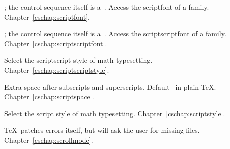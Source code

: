 \begin{glossinventory}
\item [\cs{scriptfont\gr{4-bit number}}]
      ; the control sequence itself
      is a~.
      Access the scriptfont of a family.
Chapter~\ref{cschap:scriptfont}.

\item [\cs{scriptscriptfont\gr{4-bit number}}]
      ; the control sequence itself
      is a~.
      Access the scriptscriptfont of a family.
Chapter~\ref{cschap:scriptscriptfont}.

\item [\cs{scriptscriptstyle}]
      Select the scriptscript style of math typesetting.
Chapter~\ref{cschap:scriptscriptstyle}.

\item [\cs{scriptspace}]
      Extra space after subscripts and superscripts.
      Default~\n{.5pt}      in plain \TeX.
Chapter~\ref{cschap:scriptspace}.

\item [\cs{scriptstyle}]
      Select the script style of math typesetting.
Chapter~\ref{cschap:scriptstyle}.

\item [\cs{scrollmode}]
      \TeX\ patches errors itself, but will ask the user for missing files.
Chapter~\ref{cschap:scrollmode}.


\end{glossinventory}
